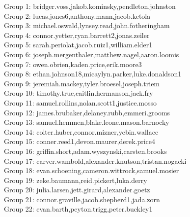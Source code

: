 \documentclass[10pt]{beamer}
\begin{document}
\begin{frame}
\footnotesize
Group 1: bridger.voss,jakob.kominsky,pendleton.johnston\\
Group 2: lucas.jones6,anthony.mann,jacob.ketola\\
Group 3: michael.oswald,lynsey.read,john.fotheringham\\
Group 4: connor.yetter,ryan.barrett2,jonas.zeiler\\
Group 5: sarah.periolat,jacob.ruiz1,william.elder1\\
Group 6: joseph.mergenthaler,matthew.nagel,aaron.loomis\\
Group 7: owen.obrien,kaden.price,erik.moore3\\
Group 8: ethan.johnson18,micaylyn.parker,luke.donaldson1\\
Group 9: jeremiah.mackey,tyler.broesel,joseph.triem\\
Group 10: timothy.true,caitlin.hermanson,jack.fry\\
Group 11: samuel.rollins,nolan.scott1,justice.mosso\\
Group 12: james.brubaker,delaney.rubb,emmeri.grooms\\
Group 13: samuel.hemmen,blake.leone,mason.barnocky\\
Group 14: colter.huber,connor.mizner,yebin.wallace\\
Group 15: conner.reed1,devon.maurer,derek.price4\\
Group 16: griffin.short,adam.wyszynski,carsten.brooks\\
Group 17: carver.wambold,alexander.knutson,tristan.nogacki\\
Group 18: evan.schoening,cameron.wittrock,samuel.mosier\\
Group 19: zeke.baumann,reid.pickert,luka.derry\\
Group 20: julia.larsen,jett.girard,alexander.goetz\\
Group 21: connor.graville,jacob.shepherd1,jada.zorn\\
Group 22: evan.barth,peyton.trigg,peter.buckley1\\\end{frame}
\end{document}
